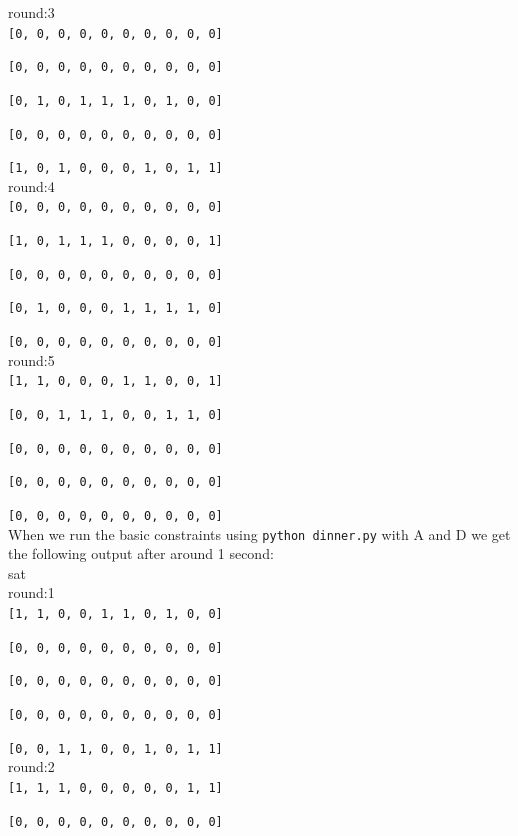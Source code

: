 \documentclass[12pt]{article}
\begin{document}
round:3\\

{\tt [0, 0, 0, 0, 0, 0, 0, 0, 0, 0]}

{\tt [0, 0, 0, 0, 0, 0, 0, 0, 0, 0]}

{\tt [0, 1, 0, 1, 1, 1, 0, 1, 0, 0]}

{\tt [0, 0, 0, 0, 0, 0, 0, 0, 0, 0]}

{\tt [1, 0, 1, 0, 0, 0, 1, 0, 1, 1]}\\

round:4\\

{\tt [0, 0, 0, 0, 0, 0, 0, 0, 0, 0]}

{\tt [1, 0, 1, 1, 1, 0, 0, 0, 0, 1]}

{\tt [0, 0, 0, 0, 0, 0, 0, 0, 0, 0]}

{\tt [0, 1, 0, 0, 0, 1, 1, 1, 1, 0]}

{\tt [0, 0, 0, 0, 0, 0, 0, 0, 0, 0]}\\

round:5\\

{\tt [1, 1, 0, 0, 0, 1, 1, 0, 0, 1]}

{\tt [0, 0, 1, 1, 1, 0, 0, 1, 1, 0]}

{\tt [0, 0, 0, 0, 0, 0, 0, 0, 0, 0]}

{\tt [0, 0, 0, 0, 0, 0, 0, 0, 0, 0]}

{\tt [0, 0, 0, 0, 0, 0, 0, 0, 0, 0]}\\

When we run the basic constraints using {\tt python dinner.py} with A and D we get the following output after around 1 second:\\

sat\\

round:1\\

{\tt [1, 1, 0, 0, 1, 1, 0, 1, 0, 0]}

{\tt [0, 0, 0, 0, 0, 0, 0, 0, 0, 0]}

{\tt [0, 0, 0, 0, 0, 0, 0, 0, 0, 0]}

{\tt [0, 0, 0, 0, 0, 0, 0, 0, 0, 0]}

{\tt [0, 0, 1, 1, 0, 0, 1, 0, 1, 1]}\\

round:2\\

{\tt [1, 1, 1, 0, 0, 0, 0, 0, 1, 1]}

{\tt [0, 0, 0, 0, 0, 0, 0, 0, 0, 0]}
\end{document}
